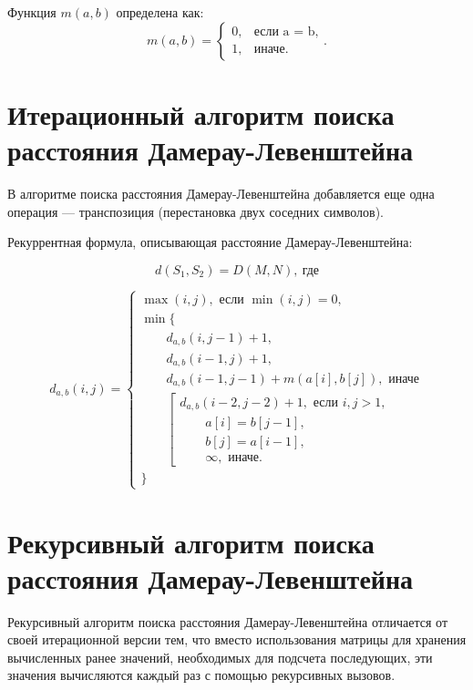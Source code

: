 Функция $m(a, b)$ определена как:
\begin{equation}
	\label{eq:m}
	m(a, b) = \begin{cases}
		0, &\text{если a = b,}\\
		1, &\text{иначе}.
	\end{cases}.
\end{equation}

\section{Итерационный алгоритм поиска расстояния Дамерау-Левенштейна}

В алгоритме поиска расстояния Дамерау-Левенштейна добавляется еще одна операция --- транспозиция (перестановка двух соседних символов).

Рекуррентная формула, описывающая расстояние Дамерау-Левенштейна:

\begin{equation}
d(S_1, S_2) = D(M, N),~\text{где}
\end{equation}

\begin{equation}
	\label{eq:a}
	d_{a,b}(i, j) = \begin{cases}
		\max(i, j), \text{ если }\min(i, j) = 0,\\
		\min \lbrace \\
		\qquad d_{a,b}(i, j-1) + 1,\\
		\qquad d_{a,b}(i-1, j) + 1,\\
		\qquad d_{a,b}(i-1, j-1) + m(a[i], b[j]), \text{ иначе}\\
		\qquad \left[ \begin{array}{cc}d_{a,b}(i-2, j-2) + 1, \text{ если }i,j > 1,\\
			\qquad \text{}a[i] = b[j-1], \\
			\qquad \text{}b[j] = a[i-1],\\
			\qquad \infty, \text{ иначе.}\end{array}\right.\\
		\rbrace
	\end{cases}
\end{equation}

\section{Рекурсивный алгоритм поиска расстояния Дамерау-Левенштейна}

Рекурсивный алгоритм поиска расстояния Дамерау-Левенштейна отличается от своей итерационной версии тем, что вместо использования матрицы для хранения вычисленных ранее значений, необходимых для подсчета последующих, эти значения вычисляются каждый раз с помощью рекурсивных вызовов.


